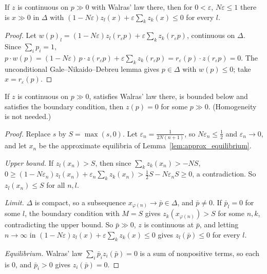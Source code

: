 \begin{lemma}
\label{lem:approx_equilibrium}
\leanok
{}
If $z$ is continuous on $p \gg 0$ with Walras' law there, then for $0 < \varepsilon$, $N\varepsilon \le 1$ there is
$x \gg 0$ in $\Delta$ with $(1 - N\varepsilon) z_l(x) + \varepsilon \sum_k z_k(x) \le 0$ for every $l$.
\end{lemma}
\begin{proof}
\leanok
Let $w(p)_l = (1 - N\varepsilon) z_l(r_\varepsilon p) + \varepsilon \sum_k z_k(r_\varepsilon p)$, continuous on $\Delta$. Since
$\sum_i p_i = 1$, $p \cdot w(p) = (1 - N\varepsilon)\, p \cdot z(r_\varepsilon p) + \varepsilon \sum_k z_k(r_\varepsilon p)
= r_\varepsilon(p) \cdot z(r_\varepsilon p) = 0$. The unconditional Gale--Nikaido--Debreu lemma gives $p \in \Delta$ with
$w(p) \le 0$; take $x = r_\varepsilon(p)$.
\end{proof}

\begin{theorem}
\label{thm:existence_boundary}
\leanok
{}
If $z$ is continuous on $p \gg 0$, satisfies Walras' law there, is bounded below and satisfies the boundary condition,
then $z(p) = 0$ for some $p \gg 0$. (Homogeneity is not needed.)
\end{theorem}
\begin{proof}
\leanok
Replace $s$ by $S = \max(s, 0)$. Let $\varepsilon_n = \frac{1}{2N(n+1)}$, so $N\varepsilon_n \le \frac12$ and
$\varepsilon_n \to 0$, and let $x_n$ be the approximate equilibria of Lemma~\ref{lem:approx_equilibrium}.

\emph{Upper bound.} If $z_l(x_n) > S$, then since $\sum_k z_k(x_n) > -NS$,
$0 \ge (1 - N\varepsilon_n) z_l(x_n) + \varepsilon_n \sum_k z_k(x_n) > \tfrac12 S - N\varepsilon_n S \ge 0$, a contradiction. So
$z_l(x_n) \le S$ for all $n, l$.

\emph{Limit.} $\Delta$ is compact, so a subsequence $x_{\varphi(n)} \to \bar p \in \Delta$, and $\bar p \ne 0$. If
$\bar p_l = 0$ for some $l$, the boundary condition with $M = S$ gives $z_k(x_{\varphi(n)}) > S$ for some $n, k$,
contradicting the upper bound. So $\bar p \gg 0$, $z$ is continuous at $\bar p$, and letting $n \to \infty$ in
$(1 - N\varepsilon) z_l(x) + \varepsilon \sum_k z_k(x) \le 0$ gives $z_l(\bar p) \le 0$ for every $l$.

\emph{Equilibrium.} Walras' law $\sum_i \bar p_i z_i(\bar p) = 0$ is a sum of nonpositive terms, so each is $0$, and
$\bar p_i > 0$ gives $z_i(\bar p) = 0$.
\end{proof}

